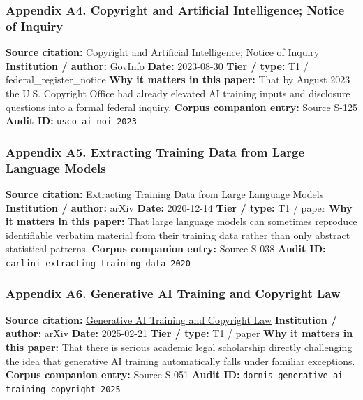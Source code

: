 \documentclass[
  american,
  11pt,
  letterpaper,
]{article}
\begin{document}
\subsubsection{Appendix A4. Copyright and Artificial Intelligence;
Notice of
Inquiry}\label{appendix-a4-copyright-and-artificial-intelligence-notice-of-inquiry}

\textbf{Source citation:}
\href{https://www.govinfo.gov/content/pkg/FR-2023-08-30/pdf/2023-18624.pdf}{Copyright
and Artificial Intelligence; Notice of Inquiry} \textbf{Institution /
author:} GovInfo \textbf{Date:} 2023-08-30 \textbf{Tier / type:} T1 /
federal\_register\_notice \textbf{Why it matters in this paper:} That by
August 2023 the U.S. Copyright Office had already elevated AI training
inputs and disclosure questions into a formal federal inquiry.
\textbf{Corpus companion entry:} Source S-125 \textbf{Audit ID:}
\texttt{usco-ai-noi-2023}

\subsubsection{Appendix A5. Extracting Training Data from Large Language
Models}\label{appendix-a5-extracting-training-data-from-large-language-models}

\textbf{Source citation:}
\href{https://arxiv.org/abs/2012.07805}{Extracting Training Data from
Large Language Models} \textbf{Institution / author:} arXiv
\textbf{Date:} 2020-12-14 \textbf{Tier / type:} T1 / paper \textbf{Why
it matters in this paper:} That large language models can sometimes
reproduce identifiable verbatim material from their training data rather
than only abstract statistical patterns. \textbf{Corpus companion
entry:} Source S-038 \textbf{Audit ID:}
\texttt{carlini-extracting-training-data-2020}

\subsubsection{Appendix A6. Generative AI Training and Copyright
Law}\label{appendix-a6-generative-ai-training-and-copyright-law}

\textbf{Source citation:}
\href{https://arxiv.org/abs/2502.15858}{Generative AI Training and
Copyright Law} \textbf{Institution / author:} arXiv \textbf{Date:}
2025-02-21 \textbf{Tier / type:} T1 / paper \textbf{Why it matters in
this paper:} That there is serious academic legal scholarship directly
challenging the idea that generative AI training automatically falls
under familiar exceptions. \textbf{Corpus companion entry:} Source S-051
\textbf{Audit ID:} \texttt{dornis-generative-ai-training-copyright-2025}
\end{document}
